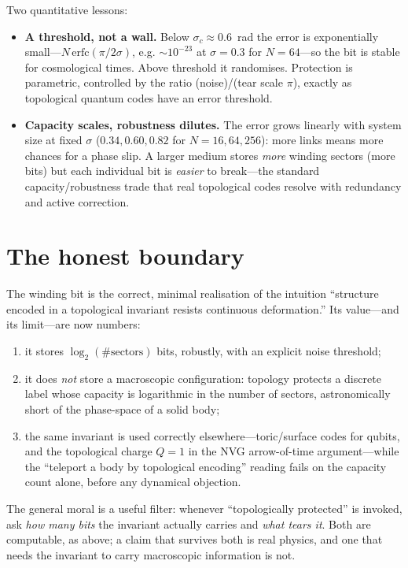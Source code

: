 \documentclass[11pt,a4paper]{article}
\begin{document}
Two quantitative lessons:
\begin{itemize}
\item \textbf{A threshold, not a wall.} Below $\sigma_c\!\approx\!0.6$~rad
  the error is exponentially small---$N\,\mathrm{erfc}(\pi/2\sigma)$, e.g.
  $\sim\!10^{-23}$ at $\sigma=0.3$ for $N=64$---so the bit is stable for
  cosmological times. Above threshold it randomises. Protection is
  parametric, controlled by the ratio (noise)/(tear scale $\pi$), exactly
  as topological quantum codes have an error threshold.
\item \textbf{Capacity scales, robustness dilutes.} The error grows
  linearly with system size at fixed $\sigma$ ($0.34,0.60,0.82$ for
  $N=16,64,256$): more links means more chances for a phase slip. A larger
  medium stores \emph{more} winding sectors (more bits) but each individual
  bit is \emph{easier} to break---the standard capacity/robustness trade
  that real topological codes resolve with redundancy and active
  correction.
\end{itemize}

\section{The honest boundary}
The winding bit is the correct, minimal realisation of the intuition
``structure encoded in a topological invariant resists continuous
deformation.'' Its value---and its limit---are now numbers:
\begin{enumerate}
\item it stores $\log_2(\#\text{sectors})$ bits, robustly, with an
  explicit noise threshold;
\item it does \emph{not} store a macroscopic configuration: topology
  protects a discrete label whose capacity is logarithmic in the number of
  sectors, astronomically short of the phase-space of a solid body;
\item the same invariant is used correctly elsewhere---toric/surface codes
  for qubits, and the topological charge $Q=1$ in the NVG arrow-of-time
  argument---while the ``teleport a body by topological encoding'' reading
  fails on the capacity count alone, before any dynamical objection.
\end{enumerate}
The general moral is a useful filter: whenever ``topologically protected''
is invoked, ask \emph{how many bits} the invariant actually carries and
\emph{what tears it}. Both are computable, as above; a claim that survives
both is real physics, and one that needs the invariant to carry
macroscopic information is not.
\end{document}
